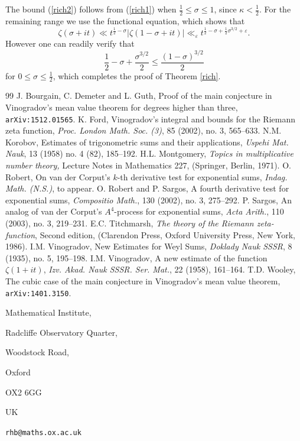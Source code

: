 \documentclass[a4paper,10pt]{article}
\newcommand{\ep}{\varepsilon}
\begin{document}
The bound (\ref{rich2}) follows from (\ref{rich1}) when
$\tfrac12\le\sigma\le 1$, since $\kappa<\tfrac12$. For the remaining
range we use the functional equation, which shows that
\[\zeta(\sigma+it)\ll t^{\tfrac12-\sigma}|\zeta(1-\sigma+it)|\ll_{\ep}
t^{\tfrac12-\sigma+\tfrac12 \sigma^{3/2}+\ep}.\]
However one can readily verify that
\[\frac{1}{2}-\sigma+\frac{\sigma^{3/2}}{2}\le\frac{(1-\sigma)^{3/2}}{2}\]
for $0\le\sigma\le\tfrac12$, which completes the proof of Theorem
\ref{rich}. 





\begin{thebibliography}{99}
J. Bourgain, C. Demeter and L. Guth, Proof of the main
  conjecture in Vinogradov's mean value theorem for degrees higher
  than three,  {\tt arXiv:1512.01565}.
 K. Ford, Vinogradov's integral and bounds for 
the Riemann zeta function, {\em Proc. London Math. Soc. (3)}, 
85 (2002), no. 3, 565--633. 
 N.M. Korobov, Estimates of trigonometric sums and 
their applications, {\em Uspehi Mat. Nauk}, 13 (1958) no. 4 (82), 185--192.
H.L. Montgomery, {\em Topics in multiplicative number
theory,} Lecture Notes in Mathematics 227, (Springer, Berlin, 1971).
O. Robert, On van der Corput’s $k$-th derivative test
  for exponential sums, {\em Indag. Math. (N.S.)}, to appear.
 O. Robert and P. Sargos, A fourth derivative test for 
exponential sums, {\em Compositio Math.}, 130 (2002), no. 3, 275--292.
 P. Sargos, An analog of van der Corput's $A^4$-process 
for exponential sums, {\em Acta Arith.}, 110 (2003), no. 3, 219--231.
 E.C. Titchmarsh, {\em The theory of the Riemann 
zeta-function}, Second edition, (Clarendon Press, Oxford University
Press, New York, 1986).
 I.M. Vinogradov, New Estimates for Weyl Sums, {\em
    Doklady Nauk SSSR}, 8 (1935), no. 5, 195--198.
 I.M. Vinogradov, A new estimate of the function $\zeta(1+it)$,
{\em Izv. Akad. Nauk SSSR. Ser. Mat.}, 22 (1958), 161--164. 
 T.D. Wooley, The cubic case of the main conjecture in 
Vinogradov's mean value theorem, {\tt arXiv:1401.3150}.

\end{thebibliography}
\bigskip
\bigskip

Mathematical Institute,

Radcliffe Observatory Quarter,

Woodstock Road,

Oxford

OX2 6GG

UK
\bigskip

{\tt rhb@maths.ox.ac.uk}
\end{document}

